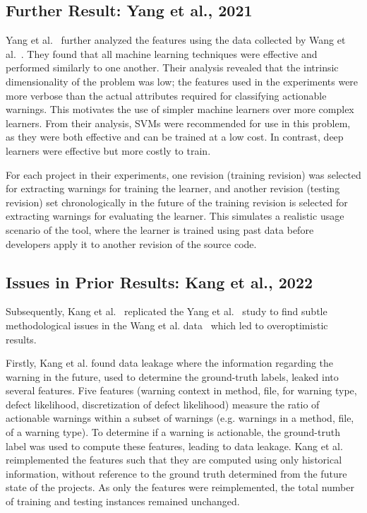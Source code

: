 \subsection{Further Result: Yang et al., 2021}

Yang et al.~\cite{yang2021learning} further analyzed the   features using the data collected by Wang et al.~\cite{wang2018there}. 
They found that all machine learning techniques were effective and performed similarly to one another. 
Their analysis revealed that the intrinsic dimensionality of the problem was low; 
the features used in the experiments were more verbose than the actual attributes required for classifying actionable warnings.
This motivates the use of simpler machine learners over more complex learners.
From their analysis, SVMs were recommended for use in this problem, as they were both effective and can be trained at a low cost.
In contrast, deep learners were effective but more costly to train.

For each project in their experiments, 
one revision (training revision) was selected for extracting warnings for training the learner, 
and another revision (testing revision) set chronologically in the future of the training revision is selected for extracting warnings for evaluating the learner. 
This simulates a realistic usage scenario of the tool, where the learner is trained using past data before developers apply it to  another revision of the source code.



\subsection{Issues in Prior Results: Kang et al., 2022}
Subsequently, Kang et al.~\cite{kang2022detecting} replicated  the Yang et al.~\cite{yang2021learning} study
to find subtle methodological issues in the     Wang et al. data~\cite{wang2018there} which   led to overoptimistic results.

Firstly, Kang et al. found data leakage where the information regarding the warning in the future, used to determine the ground-truth labels,  leaked into several features.
Five features (warning context in method, file, for warning type, defect likelihood, discretization of defect likelihood) measure the ratio of actionable warnings within a subset of warnings (e.g. warnings in a method, file, of a warning type). 
To determine if a warning is actionable, the ground-truth label was used to compute these features, leading to data leakage.
Kang et al.   reimplemented the features such that they are computed using only historical information, without reference to the ground truth determined from the future state of the projects.
As only the features were reimplemented, the total number of training and testing instances remained unchanged.

